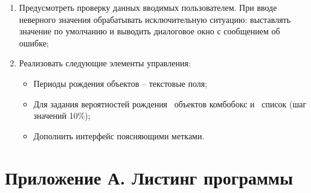 \documentclass{article}
\begin{document}
\begin{enumerate}
\item Предусмотреть проверку данных вводимых пользователем. При вводе неверного значения обрабатывать исключительную ситуацию: выставлять значение по умолчанию и выводить диалоговое окно с сообщением об ошибке;
\item Реализовать следующие элементы управления:
\begin{itemize}
	\item Периоды рождения объектов – текстовые поля;
	\item Для задания вероятностей рождения  объектов комбобокс и  список (шаг значений 	10\%);
	\item Дополнить интерфейс поясняющими метками.
\end{itemize}
\end{enumerate}

\section*{Приложение А. Листинг программы}
\end{document}
